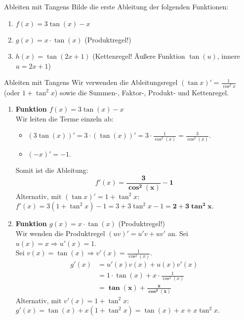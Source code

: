 \begin{aufgabenumgebung}{Ableiten mit Tangens}
Bilde die erste Ableitung der folgenden Funktionen:
\begin{enumerate}
    \item $f(x) = 3\tan(x) - x$
    \item $g(x) = x \cdot \tan(x)$ (Produktregel!)
    \item $h(x) = \tan(2x+1)$ (Kettenregel! Äußere Funktion $\tan(u)$, innere $u=2x+1$)
\end{enumerate}
\end{aufgabenumgebung}

\begin{loesungsumgebung}{Ableiten mit Tangens}
Wir verwenden die Ableitungsregel $(\tan x)' = \frac{1}{\cos^2 x}$ (oder $1+\tan^2 x$) sowie die Summen-, Faktor-, Produkt- und Kettenregel.

\begin{enumerate}[label=(\alph*)]
    \item \textbf{Funktion $f(x) = 3\tan(x) - x$} \\
    Wir leiten die Terme einzeln ab:
    \begin{itemize}
        \item $(3\tan(x))' = 3 \cdot (\tan(x))' = 3 \cdot \frac{1}{\cos^2(x)} = \frac{3}{\cos^2(x)}$.
        \item $(-x)' = -1$.
    \end{itemize}
    Somit ist die Ableitung:
    $$ f'(x) = \mathbf{\frac{3}{\cos^2(x)} - 1} $$
    Alternativ, mit $(\tan x)' = 1+\tan^2 x$:
    $f'(x) = 3(1+\tan^2 x) - 1 = 3+3\tan^2 x - 1 = \mathbf{2+3\tan^2 x}$.

    \item \textbf{Funktion $g(x) = x \cdot \tan(x)$} (Produktregel!) \\
    Wir wenden die Produktregel $(uv)' = u'v + uv'$ an.
    Sei $u(x) = x \Rightarrow u'(x) = 1$. \\
    Sei $v(x) = \tan(x) \Rightarrow v'(x) = \frac{1}{\cos^2(x)}$.
    \begin{align*}
    g'(x) &= u'(x)v(x) + u(x)v'(x) \\
            &= 1 \cdot \tan(x) + x \cdot \frac{1}{\cos^2(x)} \\
            &= \mathbf{\tan(x) + \frac{x}{\cos^2(x)}}
    \end{align*}
    Alternativ, mit $v'(x) = 1+\tan^2 x$:
    $g'(x) = \tan(x) + x(1+\tan^2 x) = \tan(x) + x + x\tan^2 x$.


\end{enumerate}
\end{loesungsumgebung}
